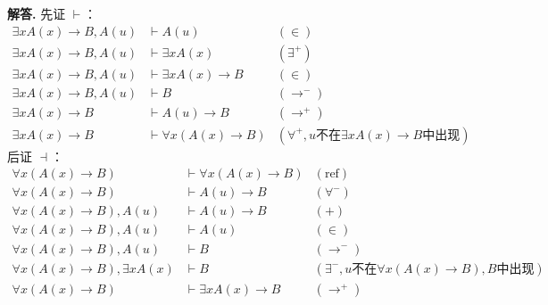 \documentclass[12pt, a4paper, oneside]{ctexart}
\newenvironment{solution}{\par\noindent\textbf{解答. }}{\par}
\begin{document}
\begin{solution}
    先证 $\vdash$：
    \begin{align*}
        \exists xA(x)\rightarrow B, A(u)
        &\vdash A(u)
        &(\in)\\
        \exists xA(x)\rightarrow B, A(u)
        &\vdash \exists xA(x)
        &(\exists^+)\\
        \exists xA(x)\rightarrow B, A(u)
        &\vdash \exists xA(x)\rightarrow B
        &(\in)\\
        \exists xA(x)\rightarrow B, A(u)
        &\vdash B
        &(\rightarrow^-)\\
        \exists xA(x)\rightarrow B 
        &\vdash A(u)\rightarrow B
        &(\rightarrow^+)\\
        \exists xA(x)\rightarrow B 
        &\vdash \forall x(A(x)\rightarrow B)
        &(\forall^+, u\text{不在}\exists xA(x)\rightarrow B\text{中出现})
    \end{align*}
    后证 $\dashv$：
    \begin{align*}
        \forall x(A(x)\rightarrow B)&\vdash
        \forall x(A(x)\rightarrow B)&(\text{ref})\\
        \forall x(A(x)\rightarrow B)
        &\vdash A(u)\rightarrow B &(\forall^-)\\
        \forall x(A(x)\rightarrow B), A(u)
        &\vdash A(u)\rightarrow B &(+)\\
        \forall x(A(x)\rightarrow B), A(u)
        &\vdash A(u) &(\in)\\
        \forall x(A(x)\rightarrow B), A(u)
        &\vdash B &(\rightarrow^-)\\
        \forall x(A(x)\rightarrow B), \exists xA(x)
        &\vdash B 
        &(\exists^-,u\text{不在}\forall x(A(x)\rightarrow B), B\text{中出现})\\
        \forall x(A(x)\rightarrow B)
        &\vdash \exists xA(x)\rightarrow B &(\rightarrow^+)
    \end{align*}
\end{solution}
\end{document}
